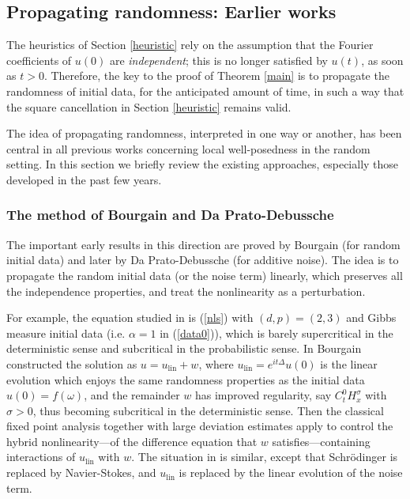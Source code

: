 \documentclass[11 pt,reqno]{amsart}
\theoremstyle{definition}
\theoremstyle{remark}
\numberwithin{equation}{section}
\begin{document}
 \subsection{Propagating randomness: Earlier works}\label{propagate} The heuristics of Section \ref{heuristic} rely on the assumption that the Fourier coefficients of $u(0)$ are \emph{independent}; this is no longer satisfied by $u(t)$, as soon as $t>0$. Therefore, the key to the proof of Theorem \ref{main} is to propagate the randomness of initial data, for the anticipated amount of time, in such a way that the square cancellation in Section \ref{heuristic} remains valid.
 
 The idea of propagating randomness, interpreted in one way or another, has been central in all previous works concerning local well-posedness in the random setting. In this section we briefly review the existing approaches, especially those developed in the past few years.
\subsubsection{The method of Bourgain and Da Prato-Debussche}\label{BDDintro} The important early results in this direction are proved by Bourgain \cite{Bourgain} (for random initial data) and later by Da Prato-Debussche \cite{DaDe} (for additive noise). The idea is to propagate the random initial data (or the noise term) linearly, which preserves all the independence properties, and treat the nonlinearity as a perturbation.

For example, the equation studied in \cite{Bourgain} is (\ref{nls}) with $(d,p)=(2,3)$ and Gibbs measure initial data (i.e. $\alpha=1$ in (\ref{data0})), which is barely supercritical in the deterministic sense and subcritical in the probabilistic sense. In \cite{Bourgain} Bourgain constructed the solution as $u=u_{\mathrm{lin}}+w$, where $u_{\mathrm{lin}}=e^{it\Delta}u(0)$ is the linear evolution which enjoys the same randomness properties as the initial data $u(0)=f(\omega)$, and the remainder $w$ has improved regularity, say $C_t^0H_x^\sigma$ with $\sigma>0$, thus becoming subcritical in the deterministic sense. Then the classical fixed point analysis together with large deviation estimates apply to control the hybrid nonlinearity---of the difference equation that $w$ satisfies---containing interactions of $u_{\mathrm{lin}}$ with $w$. The situation in \cite{DaDe} is similar, except that Schr\"{o}dinger is replaced by Navier-Stokes, and $u_{\mathrm{lin}}$ is replaced by the linear evolution of the noise term. 
\end{document}

